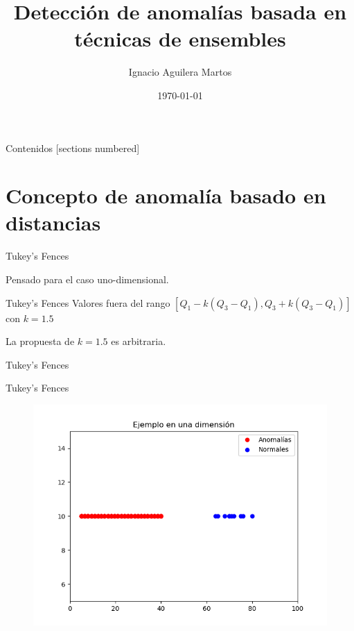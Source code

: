 \documentclass[10pt]{beamer}
\title{Detección de anomalías basada en técnicas de ensembles}
\author{Ignacio Aguilera Martos}
\date{\today}
\institute{Trabajo Fin de Grado \\ \href{https://github.com/nacheteam/Ensemble-Outlier-Analysis}{Código disponible en GitHub}}
\begin{document}
\maketitle

\begin{frame}[fragile]{Contenidos}
  [sections numbered]
  \tableofcontents[hideallsubsections]
\end{frame}

\section{Concepto de anomalía basado en distancias}

\begin{frame}[fragile]{Tukey's Fences}
\vspace{10px}
\pause
{}

Pensado para el caso uno-dimensional.

\pause

\begin{block}{Tukey's Fences}
	Valores fuera del rango $[Q_1 - k(Q_3 - Q_1), Q_3 + k(Q_3 - Q_1)]$ con $k=1.5$
\end{block}

\pause

La propuesta de $k=1.5$ es arbitraria.

\end{frame}

\begin{frame}[fragile]{Tukey's Fences}
\vspace{10px}
\centering
{}

\end{frame}

\begin{frame}[fragile]{Tukey's Fences}
\vspace{10px}

\begin{figure}
	\centering
	\includegraphics[scale=0.6]{Imagenes/outlier-1d.png}
\end{figure}

\end{frame}
\end{document}
